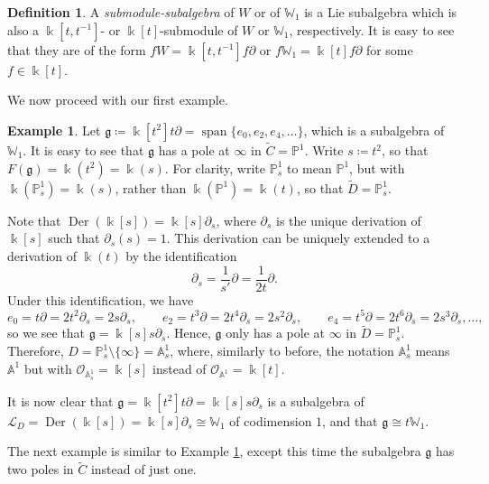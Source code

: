 \documentclass[12pt]{amsart}
\theoremstyle{plain}
\theoremstyle{definition}
\newtheorem{definition}[theorem]{Definition}
\newtheorem{example}[theorem]{Example}
\numberwithin{equation}{section}
\def\g{\mathfrak{g}}
\def\L{\mathcal{L}}
\def\O{\mathcal{O}}
\def\Aa{\mathbb{A}}
\def\PP{\mathbb{P}}
\def\WW{\mathbb{W}}
\def\kk{\Bbbk}
\DeclareMathOperator{\Der}{Der}
\DeclareMathOperator{\spn}{span}
\def\del{\partial}
\begin{document}
\begin{definition}
    A \emph{submodule-subalgebra} of $W$ or of $\WW_1$ is a Lie subalgebra which is also a $\kk[t,t^{-1}]$- or $\kk[t]$-submodule of $W$ or $\WW_1$, respectively. It is easy to see that they are of the form $fW = \kk[t,t^{-1}]f\del$ or $f\WW_1 = \kk[t]f\del$ for some $f \in \kk[t]$.
\end{definition}

We now proceed with our first example.

\begin{example}\label{ex:subalgebra of W1}
    Let $\g \coloneqq \kk[t^2]t\del = \spn\{e_0,e_2,e_4,\dots\}$, which is a subalgebra of $\WW_1$. It is easy to see that $\g$ has a pole at $\infty$ in $\widetilde{C} = \PP^1$. Write $s \coloneqq t^2$, so that $F(\g) = \kk(t^2) = \kk(s)$. For clarity, write $\PP^1_s$ to mean $\PP^1$, but with $\kk(\PP^1_s) = \kk(s)$, rather than $\kk(\PP^1) = \kk(t)$, so that $\widetilde{D} = \PP^1_s$.

    Note that $\Der(\kk[s]) = \kk[s]\del_s$, where $\del_s$ is the unique derivation of $\kk[s]$ such that $\del_s(s) = 1$. This derivation can be uniquely extended to a derivation of $\kk(t)$ by the identification
    $$\del_s = \frac{1}{s'}\del = \frac{1}{2t} \del.$$
    Under this identification, we have
    $$e_0 = t\del = 2t^2\del_s = 2s\del_s, \qquad e_2 = t^3\del = 2t^4\del_s = 2s^2\del_s, \qquad e_4 = t^5\del = 2t^6\del_s = 2s^3\del_s, \dots,$$
    so we see that $\g = \kk[s]s\del_s$. Hence, $\g$ only has a pole at $\infty$ in $\widetilde{D} = \PP^1_s$. Therefore, $D = \PP^1_s \setminus \{\infty\} = \Aa^1_s$, where, similarly to before, the notation $\Aa^1_s$ means $\Aa^1$ but with $\O_{\Aa^1_s} = \kk[s]$ instead of $\O_{\Aa^1} = \kk[t]$.
    
    It is now clear that $\g = \kk[t^2]t\del = \kk[s]s\del_s$ is a subalgebra of $\L_D = \Der(\kk[s]) = \kk[s]\del_s \cong \WW_1$ of codimension $1$, and that $\g \cong t\WW_1$.
\end{example}

The next example is similar to Example \ref{ex:subalgebra of W1}, except this time the subalgebra $\g$ has two poles in $\widetilde{C}$ instead of just one.
\end{document}
